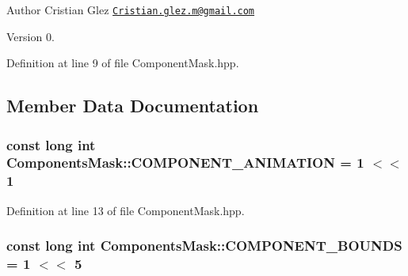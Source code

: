 \begin{DoxyAuthor}{Author}
Cristian Glez \href{mailto:Cristian.glez.m@gmail.com}{\tt Cristian.\+glez.\+m@gmail.\+com} 
\end{DoxyAuthor}
\begin{DoxyVersion}{Version}
0. 
\end{DoxyVersion}


Definition at line 9 of file Component\+Mask.\+hpp.



\subsection{Member Data Documentation}
\hypertarget{class_components_mask_ab32c9febcb2a0d312b03b41f777a23c2}{
\subsubsection[{C\+O\+M\+P\+O\+N\+E\+N\+T\+\_\+\+A\+N\+I\+M\+A\+T\+I\+O\+N}]{\setlength{\rightskip}{0pt plus 5cm}const long int Components\+Mask\+::\+C\+O\+M\+P\+O\+N\+E\+N\+T\+\_\+\+A\+N\+I\+M\+A\+T\+I\+O\+N = 1 $<$$<$ 1\hspace{0.3cm}{\ttfamily [static]}}}\label{class_components_mask_ab32c9febcb2a0d312b03b41f777a23c2}


Definition at line 13 of file Component\+Mask.\+hpp.

\hypertarget{class_components_mask_a81ccaf0bf7344c970bc8474df2625ba7}{
\subsubsection[{C\+O\+M\+P\+O\+N\+E\+N\+T\+\_\+\+B\+O\+U\+N\+D\+S}]{\setlength{\rightskip}{0pt plus 5cm}const long int Components\+Mask\+::\+C\+O\+M\+P\+O\+N\+E\+N\+T\+\_\+\+B\+O\+U\+N\+D\+S = 1 $<$$<$ 5\hspace{0.3cm}{\ttfamily [static]}}}\label{class_components_mask_a81ccaf0bf7344c970bc8474df2625ba7}


